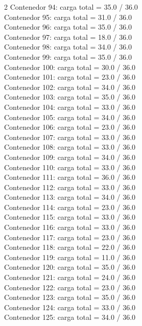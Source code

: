 \begin{multicols}{2}
Contenedor 94: carga total = 35.0 / 36.0\\
Contenedor 95: carga total = 31.0 / 36.0\\
Contenedor 96: carga total = 35.0 / 36.0\\
Contenedor 97: carga total = 18.0 / 36.0\\
Contenedor 98: carga total = 34.0 / 36.0\\
Contenedor 99: carga total = 35.0 / 36.0\\
Contenedor 100: carga total = 30.0 / 36.0\\
Contenedor 101: carga total = 23.0 / 36.0\\
Contenedor 102: carga total = 34.0 / 36.0\\
Contenedor 103: carga total = 35.0 / 36.0\\
Contenedor 104: carga total = 33.0 / 36.0\\
Contenedor 105: carga total = 34.0 / 36.0\\
Contenedor 106: carga total = 23.0 / 36.0\\
Contenedor 107: carga total = 33.0 / 36.0\\
Contenedor 108: carga total = 33.0 / 36.0\\
Contenedor 109: carga total = 34.0 / 36.0\\
Contenedor 110: carga total = 33.0 / 36.0\\
Contenedor 111: carga total = 36.0 / 36.0\\
Contenedor 112: carga total = 33.0 / 36.0\\
Contenedor 113: carga total = 34.0 / 36.0\\
Contenedor 114: carga total = 23.0 / 36.0\\
Contenedor 115: carga total = 33.0 / 36.0\\
Contenedor 116: carga total = 33.0 / 36.0\\
Contenedor 117: carga total = 23.0 / 36.0\\
Contenedor 118: carga total = 22.0 / 36.0\\
Contenedor 119: carga total = 11.0 / 36.0\\
Contenedor 120: carga total = 35.0 / 36.0\\
Contenedor 121: carga total = 24.0 / 36.0\\
Contenedor 122: carga total = 23.0 / 36.0\\
Contenedor 123: carga total = 35.0 / 36.0\\
Contenedor 124: carga total = 33.0 / 36.0\\
Contenedor 125: carga total = 34.0 / 36.0\\

\end{multicols}
